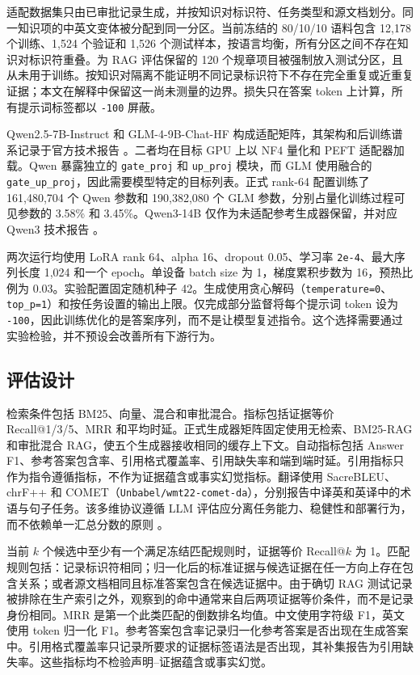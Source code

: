 适配数据集只由已审批记录生成，并按知识对标识符、任务类型和源文档划分。同一知识项的中英文变体被分配到同一分区。当前冻结的 80/10/10 语料包含 12,178 个训练、1,524 个验证和 1,526 个测试样本，按语言均衡，所有分区之间不存在知识对标识符重叠。为 RAG 评估保留的 120 个规章项目被强制放入测试分区，且从未用于训练。按知识对隔离不能证明不同记录标识符下不存在完全重复或近重复证据；本文在解释中保留这一尚未测量的边界。损失只在答案 token 上计算，所有提示词标签都以 \texttt{-100} 屏蔽。

Qwen2.5-7B-Instruct 和 GLM-4-9B-Chat-HF 构成适配矩阵，其架构和后训练谱系记录于官方技术报告 \citep{qwen2024technical,glm2024chatglm}。二者均在目标 GPU 上以 NF4 量化和 PEFT 适配器加载。Qwen 暴露独立的 \texttt{gate\_proj} 和 \texttt{up\_proj} 模块，而 GLM 使用融合的 \texttt{gate\_up\_proj}，因此需要模型特定的目标列表。正式 rank-64 配置训练了 161,480,704 个 Qwen 参数和 190,382,080 个 GLM 参数，分别占量化训练过程可见参数的 3.58\% 和 3.45\%。Qwen3-14B 仅作为未适配参考生成器保留，并对应 Qwen3 技术报告 \citep{qwen2025technical}。

两次运行均使用 LoRA rank 64、alpha 16、dropout 0.05、学习率 \texttt{2e-4}、最大序列长度 1,024 和一个 epoch。单设备 batch size 为 1，梯度累积步数为 16，预热比例为 0.03。实验配置固定随机种子 42。生成使用贪心解码（\texttt{temperature=0}、\texttt{top\_p=1}）和按任务设置的输出上限。仅完成部分监督将每个提示词 token 设为 \texttt{-100}，因此训练优化的是答案序列，而不是让模型复述指令。这个选择需要通过实验检验，并不预设会改善所有下游行为。

\subsection{评估设计}

检索条件包括 BM25、向量、混合和审批混合。指标包括证据等价 Recall@1/3/5、MRR 和平均时延。正式生成器矩阵固定使用无检索、BM25-RAG 和审批混合 RAG，使五个生成器接收相同的缓存上下文。自动指标包括 Answer F1、参考答案包含率、引用格式覆盖率、引用缺失率和端到端时延。引用指标只作为指令遵循指标，不作为证据蕴含或事实幻觉指标。翻译使用 SacreBLEU、chrF++ 和 COMET（\texttt{Unbabel/wmt22-comet-da}），分别报告中译英和英译中的术语与句子任务。该多维协议遵循 LLM 评估应分离任务能力、稳健性和部署行为，而不依赖单一汇总分数的原则 \citep{chang2024survey}。

当前 $k$ 个候选中至少有一个满足冻结匹配规则时，证据等价 Recall@$k$ 为 1。匹配规则包括：记录标识符相同；归一化后的标准证据与候选证据在任一方向上存在包含关系；或者源文档相同且标准答案包含在候选证据中。由于确切 RAG 测试记录被排除在生产索引之外，观察到的命中通常来自后两项证据等价条件，而不是记录身份相同。MRR 是第一个此类匹配的倒数排名均值。中文使用字符级 F1，英文使用 token 归一化 F1。参考答案包含率记录归一化参考答案是否出现在生成答案中。引用格式覆盖率只记录所要求的证据标签语法是否出现，其补集报告为引用缺失率。这些指标均不检验声明--证据蕴含或事实幻觉。

